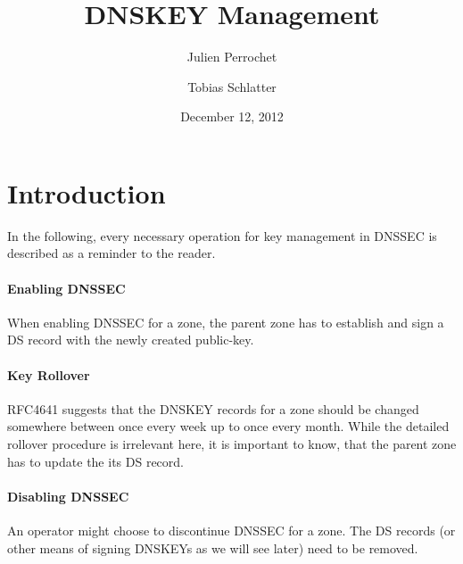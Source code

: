 \documentclass[a4paper,twocolumn]{scrartcl}
\title{DNSKEY Management}
\author{Julien Perrochet \and Tobias Schlatter}
\date{December 12, 2012}
\begin{document}



\section{Introduction}

In the following, every necessary operation for key management in
DNSSEC is described as a reminder to the reader.

\paragraph{Enabling DNSSEC} When enabling DNSSEC for a zone, the
parent zone has to establish and sign a DS record with the newly
created public-key.

\paragraph{Key Rollover} RFC4641 \cite{RFC4641} suggests that the DNSKEY
records for a zone should be changed somewhere between once every week
up to once every month. While the detailed rollover procedure is
irrelevant here, it is important to know, that the parent zone has to
update the its DS record.

\paragraph{Disabling DNSSEC} An operator might choose to discontinue
DNSSEC for a zone. The DS records (or other means of signing DNSKEYs
as we will see later) need to be removed.
\end{document}
